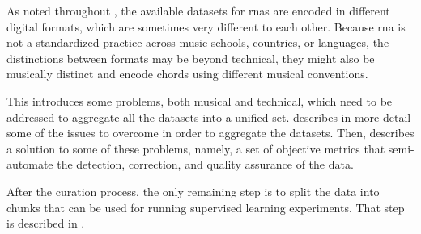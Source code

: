 
As noted throughout , the
available datasets for \glspl{rna} are encoded in different
digital formats, which are sometimes very different to each
other. Because \gls{rna} is not a standardized practice
across music schools, countries, or languages, the
distinctions between formats may be beyond technical, they
might also be musically distinct and encode chords using
different musical conventions.

This introduces some problems, both musical and technical,
which need to be addressed to aggregate all the datasets
into a unified set.
describes in more detail some of the issues to overcome in
order to aggregate the datasets. Then,
 describes a solution to
some of these problems, namely, a set of objective metrics
that semi-automate the detection, correction, and quality
assurance of the data.

After the curation process, the only remaining step is to
split the data into chunks that can be used for running
supervised learning experiments. That step is described in
.